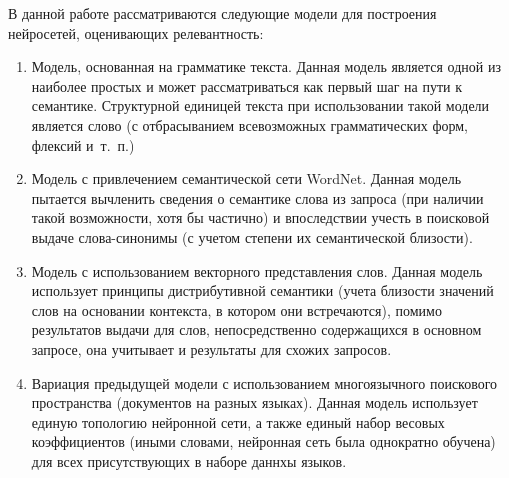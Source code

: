В данной работе рассматриваются следующие модели для построения нейросетей, оценивающих релевантность:
\begin{enumerate}[1)]
    \item Модель, основанная на грамматике текста. Данная модель является одной из наиболее простых и может
          рассматриваться как первый шаг на пути к семантике. Структурной единицей текста при использовании такой модели
          является слово (с отбрасыванием всевозможных грамматических форм, флексий и~т.~п.)
    \item Модель с привлечением семантической сети WordNet. Данная модель пытается вычленить сведения о
          семантике слова из запроса (при наличии такой возможности, хотя бы частично) и впоследствии учесть
          в поисковой выдаче слова-синонимы (с учетом степени их семантической близости).
    \item Модель с использованием векторного представления слов. Данная модель использует принципы дистрибутивной
          семантики (учета близости значений слов на основании контекста, в котором они встречаются), помимо результатов
          выдачи для слов, непосредственно содержащихся в основном запросе, она учитывает и результаты для схожих
          запросов.
    \item Вариация предыдущей модели с использованием многоязычного поискового пространства (документов на разных языках).
          Данная модель использует единую топологию нейронной сети, а также единый набор весовых коэффициентов (иными словами,
          нейронная сеть была однократно обучена) для всех присутствующих в наборе даннхы языков.
\end{enumerate}